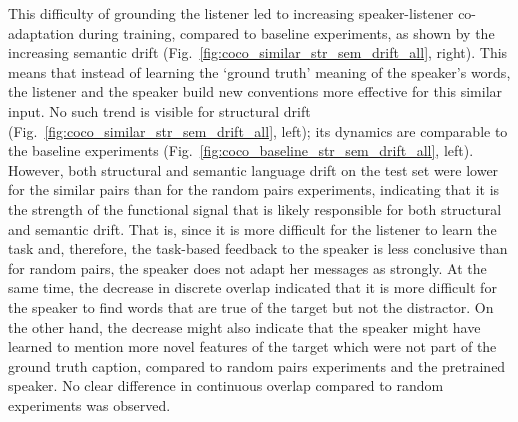 This difficulty of grounding the listener led to increasing speaker-listener co-adaptation during training, compared to baseline experiments, as shown by the increasing semantic drift (Fig.~\ref{fig:coco_similar_str_sem_drift_all}, right). This means that instead of learning the `ground truth' meaning of the speaker's words, the listener and the speaker build new conventions more effective for this similar input. No such trend is visible for structural drift (Fig.~\ref{fig:coco_similar_str_sem_drift_all}, left); its dynamics are comparable to the baseline experiments (Fig.~\ref{fig:coco_baseline_str_sem_drift_all}, left). 
However, both structural and semantic language drift on the test set were lower for the similar pairs than for the random pairs experiments, indicating that it is the strength of the functional signal that is likely responsible for both structural and semantic drift. That is, since it is more difficult for the listener to learn the task and, therefore, the task-based feedback to the speaker is less conclusive than for random pairs, the speaker does not adapt her messages as strongly.
At the same time, the decrease in discrete overlap indicated that it is more difficult for the speaker to find words that are true of the target but not the distractor. On the other hand, the decrease might also indicate that the speaker might have learned to mention more novel features of the target which were not part of the ground truth caption, compared to random pairs experiments and the pretrained speaker.  No clear difference in continuous overlap compared to random experiments was observed.

